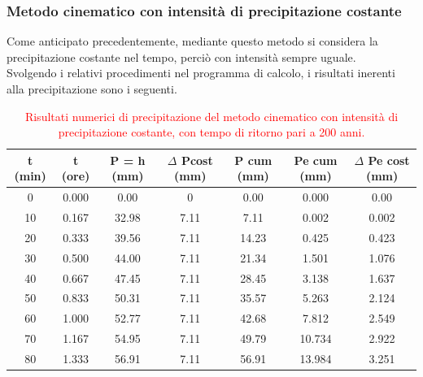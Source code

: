 \subsubsection{Metodo cinematico con intensità di precipitazione costante}
Come anticipato precedentemente, mediante questo metodo si considera la precipitazione costante nel tempo, perciò con intensità sempre uguale.\\
Svolgendo i relativi procedimenti nel programma di calcolo, i risultati inerenti alla precipitazione sono i seguenti.
\begin{table}[H] \centering
    \caption{\textcolor{red}{Risultati numerici di precipitazione del metodo cinematico con intensità di precipitazione costante, con tempo di ritorno pari a 200 anni.}}
\begin{tabular}{ccccccc}
    \toprule
t (min) & t (ore) & P = h (mm) & $\Delta$ Pcost (mm) & P cum           (mm) & Pe cum (mm) & $\Delta$ Pe cost (mm) \\
\midrule
    0       & 0.000   & 0.00                 & 0            & 0.00                 & 0.000       & 0.00           \\
    10      & 0.167   & 32.98                & 7.11         & 7.11                 & 0.002       & 0.002          \\
    20      & 0.333   & 39.56                & 7.11         & 14.23                & 0.425       & 0.423          \\
    30      & 0.500   & 44.00                & 7.11         & 21.34                & 1.501       & 1.076          \\
    40      & 0.667   & 47.45                & 7.11         & 28.45                & 3.138       & 1.637          \\
    50      & 0.833   & 50.31                & 7.11         & 35.57                & 5.263       & 2.124          \\
    60      & 1.000   & 52.77                & 7.11         & 42.68                & 7.812       & 2.549          \\
    70      & 1.167   & 54.95                & 7.11         & 49.79                & 10.734      & 2.922          \\
    80      & 1.333   & 56.91                & 7.11         & 56.91                & 13.984      & 3.251         \\
    \bottomrule
    \end{tabular}
    \end{table}

